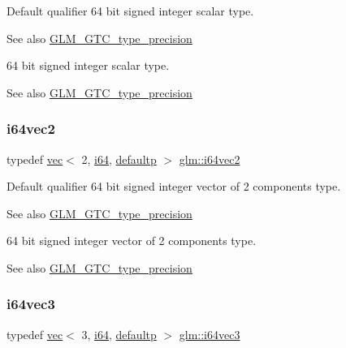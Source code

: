 Default qualifier 64 bit signed integer scalar type. \begin{DoxySeeAlso}{See also}
\hyperlink{group__gtc__type__precision}{G\+L\+M\+\_\+\+G\+T\+C\+\_\+type\+\_\+precision}
\end{DoxySeeAlso}
64 bit signed integer scalar type. \begin{DoxySeeAlso}{See also}
\hyperlink{group__gtc__type__precision}{G\+L\+M\+\_\+\+G\+T\+C\+\_\+type\+\_\+precision} 
\end{DoxySeeAlso}
\mbox{\label{group__gtc__type__precision_ga8654a1b3a6f81677f53eec13f8dd4224}} 
\subsubsection{\texorpdfstring{i64vec2}{i64vec2}}
{\footnotesize\ttfamily typedef \hyperlink{structglm_1_1vec}{vec}$<$ 2, \hyperlink{group__gtc__type__precision_gac7a7eaad46064fc952b06df33689da23}{i64}, \hyperlink{namespaceglm_a36ed105b07c7746804d7fdc7cc90ff25a9d21ccd8b5a009ec7eb7677befc3bf51}{defaultp} $>$ \hyperlink{group__gtc__type__precision_ga8654a1b3a6f81677f53eec13f8dd4224}{glm\+::i64vec2}}

Default qualifier 64 bit signed integer vector of 2 components type. \begin{DoxySeeAlso}{See also}
\hyperlink{group__gtc__type__precision}{G\+L\+M\+\_\+\+G\+T\+C\+\_\+type\+\_\+precision}
\end{DoxySeeAlso}
64 bit signed integer vector of 2 components type. \begin{DoxySeeAlso}{See also}
\hyperlink{group__gtc__type__precision}{G\+L\+M\+\_\+\+G\+T\+C\+\_\+type\+\_\+precision} 
\end{DoxySeeAlso}
\mbox{\label{group__gtc__type__precision_gad7aa290b2d88847999c1305ed5c82669}} 
\subsubsection{\texorpdfstring{i64vec3}{i64vec3}}
{\footnotesize\ttfamily typedef \hyperlink{structglm_1_1vec}{vec}$<$ 3, \hyperlink{group__gtc__type__precision_gac7a7eaad46064fc952b06df33689da23}{i64}, \hyperlink{namespaceglm_a36ed105b07c7746804d7fdc7cc90ff25a9d21ccd8b5a009ec7eb7677befc3bf51}{defaultp} $>$ \hyperlink{group__gtc__type__precision_gad7aa290b2d88847999c1305ed5c82669}{glm\+::i64vec3}}

